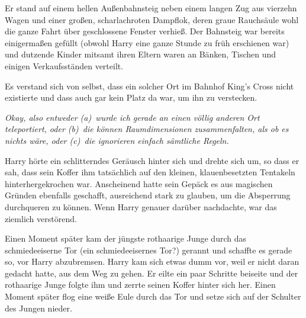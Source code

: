 Er stand auf einem hellen Außenbahnsteig neben einem langen Zug aus vierzehn Wagen und einer großen, scharlachroten Dampflok, deren graue Rauchsäule wohl die ganze Fahrt über geschlossene Fenster verhieß. Der Bahnsteig war bereits einigermaßen gefüllt (obwohl Harry eine ganze Stunde zu früh erschienen war) und dutzende Kinder mitsamt ihren Eltern waren an Bänken, Tischen und einigen Verkaufsständen verteilt.

Es verstand sich von selbst, dass ein solcher Ort im Bahnhof King's Cross nicht existierte und dass auch gar kein Platz da war, um ihn zu verstecken.

\emph{Okay, also entweder (a)~wurde ich gerade an einen völlig anderen Ort teleportiert, oder (b)~die können Raumdimensionen zusammenfalten, als ob es nichts wäre, oder (c)~die ignorieren einfach sämtliche Regeln.}

Harry hörte ein schlitterndes Geräusch hinter sich und drehte sich um, so dass er sah, dass sein Koffer ihm tatsächlich auf den kleinen, klauenbesetzten Tentakeln hinterhergekrochen war. Anscheinend hatte sein Gepäck es aus magischen Gründen ebenfalls geschafft, ausreichend stark zu glauben, um die Absperrung durchqueren zu können. Wenn Harry genauer darüber nachdachte, war das ziemlich verstörend.

Einen Moment später kam der jüngste rothaarige Junge durch das schmiedeeiserne Tor (ein schmiedeeisernes Tor?) gerannt und schaffte es gerade so, vor Harry abzubremsen. Harry kam sich etwas dumm vor, weil er nicht daran gedacht hatte, aus dem Weg zu gehen. Er eilte ein paar Schritte beiseite und der rothaarige Junge folgte ihm und zerrte seinen Koffer hinter sich her. Einen Moment später flog eine weiße Eule durch das Tor und setze sich auf der Schulter des Jungen nieder.

